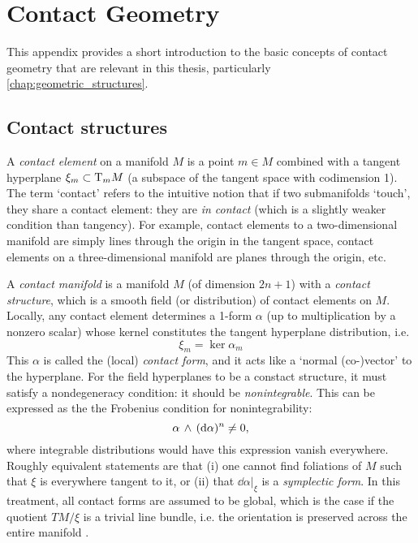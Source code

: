 \chapter{Contact Geometry}
\label{app:contact_geometry}
This appendix provides a short introduction to the basic concepts of contact geometry that are relevant in this thesis, particularly \cref{chap:geometric_structures}.

\section{Contact structures}
\label{sec:contact_structures}
A \emph{contact element} on a manifold \(M\) is a point \(m \in M\) combined with a tangent hyperplane \(\xi_m \subset \mathrm{T}_{m} M\) (a subspace of the tangent space  with codimension 1). The term `contact' refers to the intuitive notion that if two submanifolds `touch', they share a contact element: they are \emph{in contact} (which is a slightly weaker condition than tangency). \cite{Cannas2001} For example, contact elements to a two-dimensional manifold are simply lines through the origin in the tangent space, contact elements on a three-dimensional manifold are planes through the origin, etc.

A \emph{contact manifold} is a manifold \(M\) (of dimension \(2n+1\)) with a \emph{contact structure}, which is a smooth field (or distribution) of contact elements on \(M\). Locally, any contact element determines a 1-form \(\alpha\) (up to multiplication by a nonzero scalar) whose kernel constitutes the tangent hyperplane distribution, i.e. 
\begin{equation}
    \xi_m = \ker \alpha_m
    \label{eq:contact_form}
\end{equation}
This \(\alpha\) is called the (local) \emph{contact form}, and it acts like a `normal (co-)vector' to the hyperplane. For the field hyperplanes to be a constact structure, it must satisfy a nondegeneracy condition: it should be \emph{nonintegrable}. This can be expressed as the the Frobenius condition for nonintegrability: \cite{Cannas2001,Abraham1978,Arnold1989}
\begin{equation}
      \alpha\,\wedge\,(\dd{\alpha})^n  \neq 0,
\end{equation}
where integrable distributions would have this expression vanish everywhere. Roughly equivalent statements are that (i) one cannot find foliations of \(M\) such that \(\xi\) is everywhere tangent to it, or (ii) that \(\dd{\alpha}\vert_\xi\) is a \emph{symplectic form}. In this treatment, all contact forms are assumed to be global, which is the case if the quotient \(TM/\xi\) is a trivial line bundle, i.e. the orientation is preserved across the entire manifold \cite{Geiges2008}.

